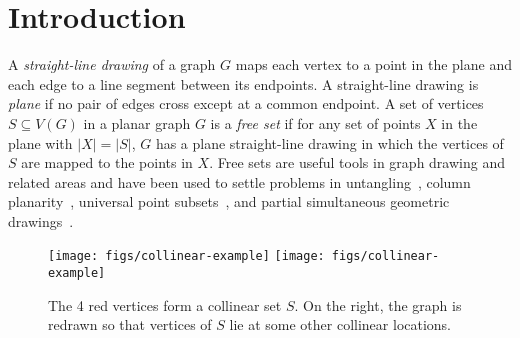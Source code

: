

\section{Introduction}


A \emph{straight-line drawing} of a graph $G$ maps each vertex to a point in the plane and each edge to a line segment between its endpoints. A straight-line
drawing is \emph{plane} if no pair of edges cross except at a
common endpoint. A set
of vertices  $S\subseteq V(G)$ in a planar graph $G$ is a \emph{free
  set} if for any set of points $X$ in the plane with $|X|=|S|$, $G$ has a plane
straight-line drawing in which the vertices of $S$ are mapped to the points in $X$.  Free sets are useful tools in graph drawing
and related areas and have been used to settle problems in
untangling~\cite{bose.dujmovic.ea:polynomial,dalozzo.dujmovic.ea:drawing,dujmovic:utility,ravsky.verbitsky:on%
}, column planarity~\cite{dalozzo.dujmovic.ea:drawing,dujmovic:utility}, universal point subsets~\cite{dalozzo.dujmovic.ea:drawing,dujmovic:utility},
and partial simultaneous geometric drawings~\cite{dujmovic:utility}.

\begin{figure*}[htb]
  \centering
  \ifSODA
  \texttt{[image: figs/collinear-example]}
  \else
  \texttt{[image: figs/collinear-example]}
  \fi
  \caption{The 4 red vertices form a collinear set $S$. On the
    right, the graph is redrawn so that vertices of $S$ lie at some
    other collinear locations.}
  \label{fig:collinear}
\end{figure*}

